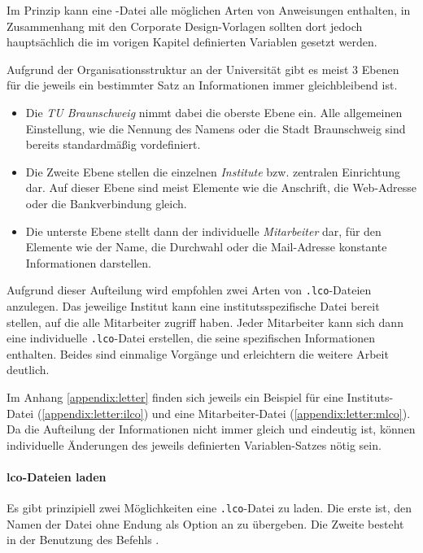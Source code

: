 Im Prinzip kann eine -Datei alle möglichen Arten von Anweisungen
enthalten, in Zusammenhang mit den Corporate Design-Vorlagen sollten dort jedoch
hauptsächlich die im vorigen Kapitel definierten Variablen gesetzt werden.

Aufgrund der Organisationsstruktur an der Universität gibt es meist 3 Ebenen für
die jeweils ein bestimmter Satz an Informationen immer gleichbleibend ist.

\begin{itemize}
  \item Die \emph{TU Braunschweig} nimmt dabei die oberste Ebene ein. Alle allgemeinen
    Einstellung, wie die Nennung des Namens oder die Stadt Braunschweig sind
    bereits standardmäßig vordefiniert.

  \item Die Zweite Ebene stellen die einzelnen \emph{Institute} bzw.
    zentralen Einrichtung dar. Auf dieser Ebene sind meist Elemente wie die
    Anschrift, die Web-Adresse oder die Bankverbindung gleich.

  \item Die unterste Ebene stellt dann der individuelle \emph{Mitarbeiter} dar,
    für den Elemente wie der Name, die Durchwahl oder die Mail-Adresse konstante
    Informationen darstellen.
\end{itemize}

Aufgrund dieser Aufteilung wird empfohlen zwei Arten von \texttt{.lco}-Dateien
anzulegen. Das jeweilige Institut kann eine institutsspezifische Datei
bereit stellen, auf die alle Mitarbeiter zugriff haben. Jeder Mitarbeiter kann
sich dann eine individuelle \texttt{.lco}-Datei erstellen, die seine spezifischen
Informationen enthalten. Beides sind einmalige Vorgänge und erleichtern die
weitere Arbeit deutlich.

Im Anhang \ref{appendix:letter} finden sich jeweils ein Beispiel für eine
Instituts-Datei (\ref{appendix:letter:ilco}) und eine Mitarbeiter-Datei
(\ref{appendix:letter:mlco}). Da die Aufteilung der Informationen nicht immer 
gleich und eindeutig ist, können individuelle Änderungen des jeweils definierten
Variablen-Satzes nötig sein.

\paragraph{lco-Dateien laden}

Es gibt prinzipiell zwei Möglichkeiten eine \texttt{.lco}-Datei zu laden.
Die erste ist, den Namen der Datei ohne Endung als Option an
 zu übergeben.
Die Zweite besteht in der Benutzung des Befehls .

